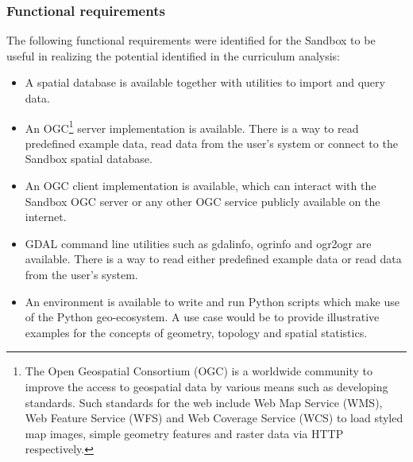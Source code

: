 \documentclass[11pt, a4paper, oneside, parskip=full-]{scrartcl}
\begin{document}
\subsubsection{Functional requirements}
The following functional requirements were identified for the Sandbox to be
useful in realizing the potential identified in the curriculum analysis:
\begin{itemize}
  \item A spatial database is available together with utilities to import and
  query data.
  \item An OGC\footnote{The Open Geospatial Consortium (OGC) is a worldwide
  community to improve the access to geospatial data by various means such as
  developing standards. Such standards for the web include Web Map Service
  (WMS), Web Feature Service (WFS) and Web Coverage Service (WCS) to load styled
  map images, simple geometry features and raster data via HTTP respectively.}
  server implementation is available. There is a way to read predefined example
  data, read data from the user's system or connect to the Sandbox spatial
  database.
  \item An OGC client implementation is available, which can interact with the
  Sandbox OGC server or any other OGC service publicly available on the
  internet.
  \item GDAL\cite{gdal} command line utilities such as gdalinfo, ogrinfo and
  ogr2ogr are available. There is a way to read either predefined example data
  or read data from the user's system.
  \item An environment is available to write and run Python scripts which make
  use of the Python geo-ecosystem. A use case would be to provide illustrative
  examples for the concepts of geometry, topology and spatial statistics.
\end{itemize}

\end{document}

